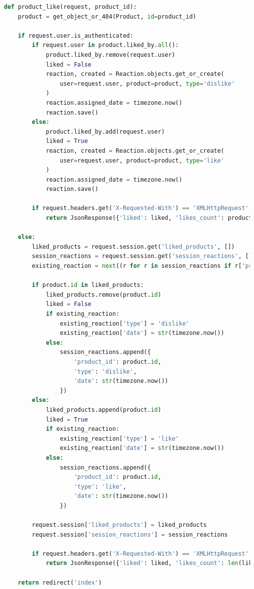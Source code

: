 \documentclass[12pt,a4paper,oneside]{article}
\theoremstyle{definition}
\numberwithin{equation}{section}
\begin{document}
\begin{lstlisting}[language=Python, caption=Widok \texttt{product\_like}, label=product_like_view]
def product_like(request, product_id):
    product = get_object_or_404(Product, id=product_id)

    if request.user.is_authenticated:
        if request.user in product.liked_by.all():
            product.liked_by.remove(request.user)
            liked = False
            reaction, created = Reaction.objects.get_or_create(
                user=request.user, product=product, type='dislike'
            )
            reaction.assigned_date = timezone.now()
            reaction.save()
        else:
            product.liked_by.add(request.user)
            liked = True
            reaction, created = Reaction.objects.get_or_create(
                user=request.user, product=product, type='like'
            )
            reaction.assigned_date = timezone.now()
            reaction.save()

        if request.headers.get('X-Requested-With') == 'XMLHttpRequest':
            return JsonResponse({'liked': liked, 'likes_count': product.liked_by.count()})

    else:
        liked_products = request.session.get('liked_products', [])
        session_reactions = request.session.get('session_reactions', [])
        existing_reaction = next((r for r in session_reactions if r['product_id'] == product.id), None)

        if product.id in liked_products:
            liked_products.remove(product.id)
            liked = False
            if existing_reaction:
                existing_reaction['type'] = 'dislike'
                existing_reaction['date'] = str(timezone.now())
            else:
                session_reactions.append({
                    'product_id': product.id,
                    'type': 'dislike',
                    'date': str(timezone.now())
                })
        else:
            liked_products.append(product.id)
            liked = True
            if existing_reaction:
                existing_reaction['type'] = 'like'
                existing_reaction['date'] = str(timezone.now())
            else:
                session_reactions.append({
                    'product_id': product.id,
                    'type': 'like',
                    'date': str(timezone.now())
                })

        request.session['liked_products'] = liked_products
        request.session['session_reactions'] = session_reactions

        if request.headers.get('X-Requested-With') == 'XMLHttpRequest':
            return JsonResponse({'liked': liked, 'likes_count': len(liked_products)})

    return redirect('index')
\end{lstlisting}
\end{document}
